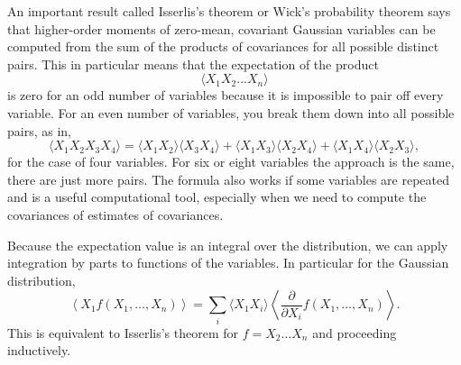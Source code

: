 An important result called Isserlis's theorem or Wick's probability theorem says that higher-order moments of zero-mean, covariant Gaussian variables can be computed from the sum of the products of covariances for all possible distinct pairs.  This in particular means that the expectation of the product
\begin{equation}
  \langle X_1 X_2 ... X_n \rangle
\end{equation}
is zero for an odd number of variables because it is impossible to pair off every variable.  For an even number of variables, you break them down into all possible pairs, as in,
\begin{equation}
  \langle X_1 X_2 X_3 X_4 \rangle = \langle X_1 X_2  \rangle \langle X_3 X_4  \rangle+  \langle X_1 X_3  \rangle \langle X_2 X_4  \rangle+  \langle X_1 X_4  \rangle \langle X_2 X_3 \rangle,
\end{equation}
for the case of four variables.  For six or eight variables the approach is the same, there are just more pairs.  The formula also works if some variables are repeated and is a useful computational tool, especially when we need to compute the covariances of estimates of covariances.

Because the expectation value is an integral over the distribution, we can apply integration by parts to  functions of the variables.  In particular for the Gaussian distribution, 
\begin{equation}
 \left \langle X_1 f(X_1,\dots,X_n) \right \rangle = \sum_i \langle X_1 X_i \rangle \left\langle \frac{\partial}{\partial X_i} f(X_1,\dots,X_n) \right \rangle. \label{eq:gaussian_integration_by_parts}
\end{equation}
This is equivalent to Isserlis's theorem for $f = X_2 \dots X_n$ and proceeding inductively.

